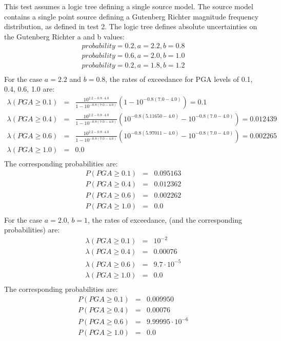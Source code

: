 This test assumes a logic tree defining a single source model. The source model
contains a single point source defining a Gutenberg Richter magnitude frequency
distribution, as defined in test 2. The logic tree defines absolute
uncertainties on the Gutenberg Richter a and b values:
\begin{eqnarray}
probability = 0.2, a = 2.2, b = 0.8 \nonumber \\
probability = 0.6, a = 2.0, b = 1.0 \nonumber \\
probability = 0.2, a = 1.8, b = 1.2 \nonumber \\
\end{eqnarray}
For the case $a=2.2$ and $b=0.8$, the rates of exceedance for PGA levels of 0.1, 0.4, 0.6, 1.0 are:
\begin{eqnarray}
\lambda(PGA \geq 0.1) &=& \frac{10^{2.2 - 0.8\cdot4.0}}{1 - 10^{-0.8(7.0 - 4.0)}}(1 - 10^{-0.8(7.0 - 4.0)}) = 0.1 \nonumber \\
\lambda(PGA \geq 0.4) &=& \frac{10^{2.2 - 0.8\cdot4.0}}{1 - 10^{-0.8(7.0 - 4.0)}}(10^{-0.8(5.11650-4.0)} - 10^{-0.8(7.0 - 4.0)}) = 0.012439 \nonumber \\
\lambda(PGA \geq 0.6) &=& \frac{10^{2.2 - 0.8\cdot4.0}}{1 - 10^{-0.8(7.0 - 4.0)}}(10^{-0.8(5.97011-4.0)} - 10^{-0.8(7.0 - 4.0)}) = 0.002265 \nonumber \\
\lambda(PGA \geq 1.0) &=& 0.0 \nonumber \\
\end{eqnarray}
The corresponding probabilities are:
\begin{eqnarray}
P(PGA \geq 0.1) &=& 0.095163\nonumber \\
P(PGA \geq 0.4) &=& 0.012362\nonumber \\
P(PGA \geq 0.6) &=& 0.002262\nonumber \\
P(PGA \geq 1.0) &=& 0.0\nonumber \\
\end{eqnarray}
For the case $a=2.0$, $b=1$, the rates of exceedance, (and the corresponding probabilities) are:
\begin{eqnarray}
\lambda(PGA \geq 0.1) &=& 10^{-2} \nonumber \\
\lambda(PGA \geq 0.4) &=& 0.00076 \nonumber \\
\lambda(PGA \geq 0.6) &=& 9.7\cdot 10^{-5} \nonumber \\
\lambda(PGA \geq 1.0) &=& 0.0 \nonumber \\
\end{eqnarray}
The corresponding probabilities are:
\begin{eqnarray}
P(PGA \geq 0.1) &=& 0.009950 \nonumber \\
P(PGA \geq 0.4) &=& 0.00076 \nonumber \\
P(PGA \geq 0.6) &=&  9.99995\cdot10^{-6} \nonumber \\
P(PGA \geq 1.0) &=&  0.0 \nonumber \\
\end{eqnarray}
